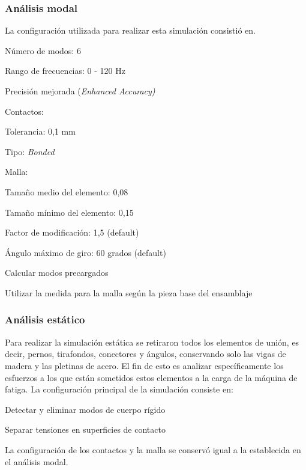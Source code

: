 \subsubsection{Análisis modal}
La configuración utilizada para realizar esta simulación consistió en\footnotemark . 
\begin{itemize*}
	\item Número de modos: 6
	\item Rango de frecuencias: 0 - 120 Hz
	\item Precisión mejorada (\textit{Enhanced Accuracy)}
	\item Contactos:
		\begin{itemize*}
			\item Tolerancia: 0,1 mm
			\item Tipo: \textit{Bonded}
		\end{itemize*}
	\item Malla:
		\begin{itemize*}
			\item Tamaño medio del elemento: 0,08
			\item Tamaño mínimo del elemento: 0,15
			\item Factor de modificación: 1,5 (default)
			\item Ángulo máximo de giro: 60 grados (default)
			\item Calcular modos precargados
			\item Utilizar la medida para la malla según la pieza base del ensamblaje
		\end{itemize*}
\end{itemize*}

\subsubsection{Análisis estático}
Para realizar la simulación estática se retiraron todos los elementos de unión, es decir, pernos, tirafondos, conectores y ángulos, conservando solo las vigas de madera y las pletinas de acero. El fin de esto es analizar específicamente los esfuerzos a los que están sometidos estos elementos a la carga de la máquina de fatiga. La configuración principal de la simulación consiste en\footnotemark[\value{footnote}]:
\begin{itemize*}
	\item Detectar y eliminar modos de cuerpo rígido
	\item Separar tensiones en superficies de contacto
\end{itemize*}
La configuración de los contactos y la malla se conservó igual a la establecida en el análisis modal.

